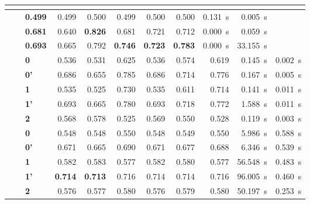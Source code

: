 \setlength{\tabcolsep}{3pt}
\begin{table}
\centering
\begin{tabular}{>{\bfseries}l >{\bfseries}l >{\bfseries}l >{\hspace{2ex}} r r r r r r r r}
\toprule
\ct{Dataset} & \ct{Model} & \ct{Level} & \ct{Acc.} & \ct{Prec.} & \ct{Rec.} & \ct{AUC} & \ct{F\textsubscript{1}} & \ct{F\textsubscript{4}} & \ct{t\textsubscript{fit}} & \ct{t\textsubscript{pred}} \\
\midrule

\multirow{13}{*}{$\Upsilon$}

& \multicolumn{2}{>{\bfseries}l}{Random}
&       0.499 & 0.499 & 0.500 & 0.499 & 0.500 & 0.500 & \SI{0.131}{\second} & \SI{0.005}{\second} \\

& \multicolumn{2}{>{\bfseries}l}{Majority}
&       0.681 & 0.640 & \textbf{0.826} & 0.681 & 0.721 & 0.712 & \SI{0.000}{\second} & \SI{0.059}{\second} \\

& \multicolumn{2}{>{\bfseries}l}{Bayesian\protect\footnotemark{}}
&       0.693 & 0.665 & 0.792 & \textbf{0.746} & \textbf{0.723} & \textbf{0.783} & \SI{0.000}{\second} & \SI{33.155}{\second} \\
\cmidrule{2-11}

& \multirow{5}{*}{LR} &
   0  & 0.536 & 0.531 & 0.625 & 0.536 & 0.574 & 0.619 & \SI{0.145}{\second}   & \SI{0.002}{\second} \\
&& 0' & 0.686 & 0.655 & 0.785 & 0.686 & 0.714 & 0.776 & \SI{0.167}{\second}   & \SI{0.005}{\second} \\
&& 1  & 0.535 & 0.525 & 0.730 & 0.535 & 0.611 & 0.714 & \SI{0.141}{\second}   & \SI{0.011}{\second} \\
&& 1' & 0.693 & 0.665 & 0.780 & 0.693 & 0.718 & 0.772 & \SI{1.588}{\second}   & \SI{0.011}{\second} \\
&& 2  & 0.568 & 0.578 & 0.525 & 0.569 & 0.550 & 0.528 & \SI{0.119}{\second}   & \SI{0.003}{\second} \\
\cmidrule{2-11}

& \multirow{5}{*}{RF} &
   0  & 0.548 & 0.548 & 0.550 & 0.548 & 0.549 & 0.550 & \SI{5.986}{\second}   & \SI{0.588}{\second} \\
&& 0' & 0.671 & 0.665 & 0.690 & 0.671 & 0.677 & 0.688 & \SI{6.346}{\second}   & \SI{0.539}{\second} \\
&& 1  & 0.582 & 0.583 & 0.577 & 0.582 & 0.580 & 0.577 & \SI{56.548}{\second}  & \SI{0.483}{\second} \\
&& 1' & \textbf{0.714} & \textbf{0.713} & 0.716 & 0.714 & 0.714 & 0.716 & \SI{96.005}{\second}  & \SI{0.460}{\second} \\
&& 2  & 0.576 & 0.577 & 0.580 & 0.576 & 0.579 & 0.580 & \SI{50.197}{\second}  & \SI{0.253}{\second} \\
\midrule


\end{tabular}
\end{table}
